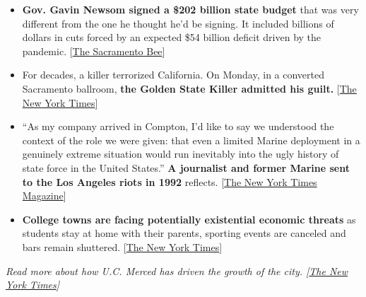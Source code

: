 \begin{itemize}
\item
  \textbf{Gov. Gavin Newsom signed a \$202 billion state budget} that
  was very different from the one he thought he'd be signing. It
  included billions of dollars in cuts forced by an expected \$54
  billion deficit driven by the pandemic.
  {[}\href{https://www.sacbee.com/news/politics-government/capitol-alert/article243876497.html}{The
  Sacramento Bee}{]}
\item
  For decades, a killer terrorized California. On Monday, in a converted
  Sacramento ballroom, \textbf{the Golden State Killer admitted his
  guilt.}
  {[}\href{https://www.nytimes3xbfgragh.onion/2020/06/29/us/golden-state-killer-joseph-deangelo.html?referringSource=articleShare}{The
  New York Times}{]}
\item
  ``As my company arrived in Compton, I'd like to say we understood the
  context of the role we were given: that even a limited Marine
  deployment in a genuinely extreme situation would run inevitably into
  the ugly history of state force in the United States.'' \textbf{A
  journalist and former Marine sent to the Los Angeles riots in 1992}
  reflects.
  {[}\href{https://www.nytimes3xbfgragh.onion/2020/06/23/magazine/la-riots-1992.html}{The
  New York Times Magazine}{]}
\item
  \textbf{College towns are facing potentially existential economic
  threats} as students stay at home with their parents, sporting events
  are canceled and bars remain shuttered.
  {[}\href{https://www.nytimes3xbfgragh.onion/2020/06/28/us/coronavirus-college-towns.html?smid=tw-share}{The
  New York Times}{]}
\end{itemize}

\emph{Read more about how U.C. Merced has driven the growth of the city.
{[}}\href{https://www.nytimes3xbfgragh.onion/2019/08/05/us/uc-merced-chancellor-leland.html}{\emph{The
New York Times}}\emph{{]}}


